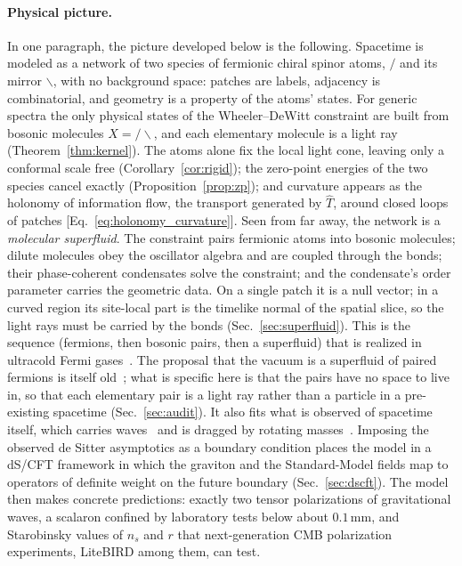 \documentclass[reprint,aps,prd,amsmath,amssymb,superscriptaddress,nofootinbib,floatfix]{revtex4-2}
\theoremstyle{plain}
\theoremstyle{definition}
\theoremstyle{remark}
\newcommand{\Lat}{\ensuremath{/}}                 %
\newcommand{\Rat}{\ensuremath{\backslash}}        %
\newcommand{\Mol}{\ensuremath{X}}                 %
\newcommand{\Tc}{\hat{T}}
\begin{document}
\paragraph*{Physical picture.} In one paragraph, the picture developed below is the following. Spacetime is
modeled as a network of two species of fermionic chiral spinor atoms, $\Lat$ and its mirror $\Rat$, with no background
space: patches are labels, adjacency is combinatorial, and geometry is a property of the atoms' states. For generic
spectra the only physical states of the Wheeler--DeWitt constraint are built from bosonic molecules $\Mol=\Lat\Rat$, and
each elementary molecule is a light ray (Theorem~\ref{thm:kernel}). The atoms alone fix the local light cone, leaving only a conformal
scale free (Corollary~\ref{cor:rigid}); the zero-point energies of the two species cancel exactly
(Proposition~\ref{prop:zp}); and curvature appears as the holonomy of information flow, the transport generated by $\Tc$,
around closed loops of patches [Eq.~\eqref{eq:holonomy_curvature}]. Seen from far away, the network is a
\emph{molecular superfluid}. The constraint pairs fermionic atoms into bosonic molecules; dilute molecules obey the oscillator algebra and are
coupled through the bonds; their phase-coherent condensates solve the constraint; and the condensate's order parameter
carries the geometric data. On a single patch it is a null vector; in a curved region its site-local part is the timelike
normal of the spatial slice, so the light rays must be carried by the bonds (Sec.~\ref{sec:superfluid}). This is the sequence (fermions, then bosonic pairs, then a superfluid) that is realized in
ultracold Fermi gases~\cite{Greiner2003,Zwierlein2005}. The proposal that the vacuum is a superfluid of paired fermions is
itself old~\cite{SinhaSivaramSudarshan1976}; what is specific here is that the pairs have no space to live in, so that each
elementary pair is a light ray rather than a particle in a pre-existing spacetime (Sec.~\ref{sec:audit}). It also fits what is observed of spacetime itself, which
carries waves~\cite{GW150914} and is dragged by rotating masses~\cite{Everitt2011}. Imposing the observed de Sitter
asymptotics as a boundary condition places the model in a dS/CFT framework in which the graviton and the Standard-Model
fields map to operators of definite weight on the future boundary (Sec.~\ref{sec:dscft}). The model then makes concrete
predictions: exactly two tensor polarizations of gravitational waves, a scalaron confined by laboratory tests below
about $0.1$\,mm, and Starobinsky values of $n_s$ and $r$ that next-generation CMB polarization experiments, LiteBIRD
among them, can test.
\end{document}
